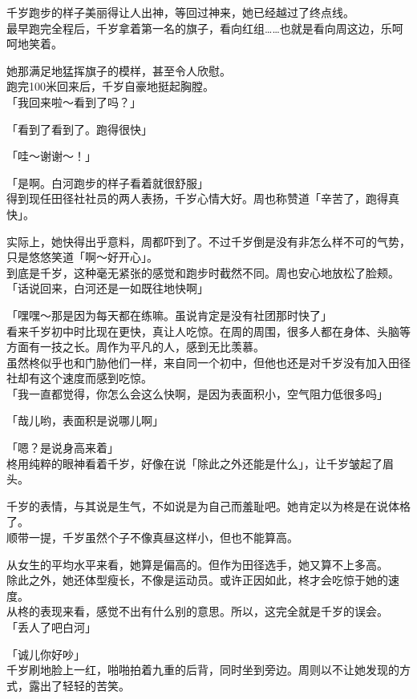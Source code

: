 千岁跑步的样子美丽得让人出神，等回过神来，她已经越过了终点线。\\

最早跑完全程后，千岁拿着第一名的旗子，看向红组……也就是看向周这边，乐呵呵地笑着。

她那满足地猛挥旗子的模样，甚至令人欣慰。\\

跑完100米回来后，千岁自豪地挺起胸膛。\\

「我回来啦～看到了吗？」

「看到了看到了。跑得很快」

「哇～谢谢～！」

「是啊。白河跑步的样子看着就很舒服」\\

得到现任田径社社员的两人表扬，千岁心情大好。周也称赞道「辛苦了，跑得真快」。

实际上，她快得出乎意料，周都吓到了。不过千岁倒是没有非怎么样不可的气势，只是悠悠笑道「啊～好开心」。\\

到底是千岁，这种毫无紧张的感觉和跑步时截然不同。周也安心地放松了脸颊。\\

「话说回来，白河还是一如既往地快啊」

「嘿嘿～那是因为每天都在练嘛。虽说肯定是没有社团那时快了」\\

看来千岁初中时比现在更快，真让人吃惊。在周的周围，很多人都在身体、头脑等方面有一技之长。周作为平凡的人，感到无比羡慕。\\

虽然柊似乎也和门胁他们一样，来自同一个初中，但他也还是对千岁没有加入田径社却有这个速度而感到吃惊。\\

「我一直都觉得，你怎么会这么快啊，是因为表面积小，空气阻力低很多吗」

「哉儿哟，表面积是说哪儿啊」

「嗯？是说身高来着」\\

柊用纯粹的眼神看着千岁，好像在说「除此之外还能是什么」，让千岁皱起了眉头。

千岁的表情，与其说是生气，不如说是为自己而羞耻吧。她肯定以为柊是在说体格了。\\

顺带一提，千岁虽然个子不像真昼这样小，但也不能算高。

从女生的平均水平来看，她算是偏高的。但作为田径选手，她又算不上多高。\\

除此之外，她还体型瘦长，不像是运动员。或许正因如此，柊才会吃惊于她的速度。\\

从柊的表现来看，感觉不出有什么别的意思。所以，这完全就是千岁的误会。\\

「丢人了吧白河」

「诚儿你好吵」\\

千岁刷地脸上一红，啪啪拍着九重的后背，同时坐到旁边。周则以不让她发现的方式，露出了轻轻的苦笑。
